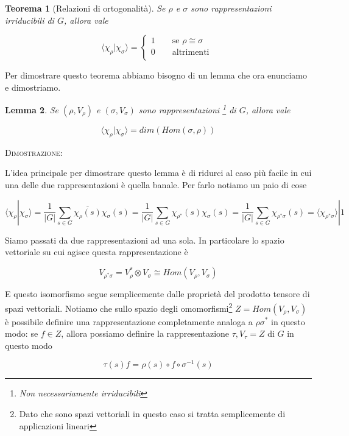 \documentclass[11pt]{article}
\theoremstyle{plain}
\newtheorem{thm}{Teorema}[section]
\newtheorem{lemma}[thm]{Lemma}
\theoremstyle{definition}
\theoremstyle{remark}
\newcommand{\dsum}{\displaystyle\sum}
\begin{document}
\begin{thm}[Relazioni di ortogonalità]
Se $\rho$ e $\sigma$ sono rappresentazioni irriducibili di $G$, allora vale

\[\langle \chi_{\rho}|\chi_{\sigma} \rangle = \begin{cases}
1 \qquad \text{se } \rho \cong \sigma \\
0 \qquad \text{altrimenti }\\
\end{cases} \]
\label{relazione di ortogonalita}
\end{thm}

Per dimostrare questo teorema abbiamo bisogno di un lemma che ora enunciamo e dimostriamo.




\begin{lemma}
Se $(\rho, V_\rho)$ e $(\sigma, V_\sigma)$ sono rappresentazioni \footnote{Non necessariamente irriducibili} di $G$, allora vale

\[ \langle \chi_\rho | \chi_\sigma \rangle  = dim(Hom (\sigma, \rho))\] 
\label{lemma relazioni ortogonalita}
\end{lemma}
\textsc{Dimostrazione:}

L'idea principale per dimostrare questo lemma è di ridurci al caso più facile in cui una delle due rappresentazioni è quella banale. Per farlo notiamo un paio di cose

\[ \langle \chi_\rho | \chi_\sigma \rangle = \dfrac{1}{|G|} \dsum_{s\in G} \overline{\chi_\rho(s)} \chi_\sigma(s) = \dfrac{1}{|G|} \dsum_{s\in G} {\chi_{\rho^*}(s)} \chi_\sigma(s) = \dfrac{1}{|G|} \dsum_{s\in G} \chi_{\rho^*\sigma}(s)  = \langle \chi_{\rho^*\sigma} \rangle | 1\]

Siamo passati da due rappresentazioni ad una sola. In particolare lo spazio vettoriale su cui agisce questa rappresentazione è 

\[ V_{\rho^* \sigma} = V_{\rho}^* \otimes V_\sigma \cong Hom(V_\rho, V_\sigma)\]

E questo isomorfismo segue semplicemente dalle proprietà del prodotto tensore di spazi vettoriali. Notiamo che sullo spazio degli omomorfismi\footnote{Dato che sono spazi vettoriali in questo caso si tratta semplicemente di applicazioni lineari} $Z = Hom(V_\rho, V_\sigma)$ è possibile definire una rappresentazione completamente analoga a $\rho\sigma^*$ in questo modo: se $f \in Z$, allora possiamo definire la rappresentazione $\tau, V_\tau = Z$ di $G$ in questo modo

\[ \tau(s)f = \rho(s) \circ f \circ \sigma^{-1}(s)\]
\end{document}
